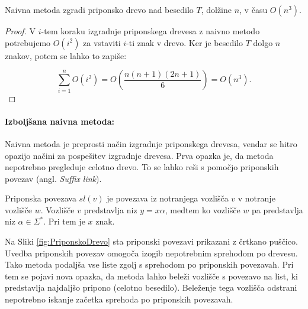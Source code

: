 \begin{izr}\label{izr:naivna}
    Naivna metoda zgradi priponsko drevo nad besedilo $T$, dolžine $n$, v času $O(n^3)$.
\end{izr}

\begin{proof}
    V $i$-tem koraku izgradnje priponskega drevesa z naivno metodo potrebujemo $O(i^2)$ za vstaviti $i$-ti znak v drevo. Ker je besedilo $T$ dolgo $n$ znakov, potem se lahko to zapiše:

    $$
        \sum_{i=1}^n O(i^2)= O\left(\dfrac{n(n+1)(2n+1)}{6}\right)=O(n^3).
    $$
\end{proof}

\paragraph{Izboljšana naivna metoda:}
Naivna metoda je preprosti način izgradnje priponskega drevesa, vendar se hitro opazijo načini za pospešitev izgradnje drevesa. Prva opazka je, da metoda nepotrebno pregleduje celotno drevo. To se lahko reši s pomočjo priponskih povezav (angl. \textit{Suffix link}).

\begin{defi}\label{def:sl}
    Priponska povezava $sl(v)$ je povezava iz notranjega vozlišča $v$ v notranje vozlišče $w$. Vozlišče $v$ predstavlja niz $y=x\alpha $, medtem ko vozlišče $w$ pa predstavlja niz $\alpha\in\Sigma^*$. Pri tem je $x$ znak.
\end{defi}

Na Sliki \ref{fig:PriponskoDrevo} sta priponski povezavi prikazani z črtkano puščico. Uvedba priponskih povezav omogoča izogib nepotrebnim sprehodom po drevesu. Tako metoda podaljša vse liste zgolj s sprehodom po priponskih povezavah. Pri tem se pojavi nova opazka, da metoda lahko beleži vozlišče s povezavo na list, ki predstavlja najdaljšo pripono (celotno besedilo). Beleženje tega vozlišča odstrani nepotrebno iskanje začetka sprehoda po priponskih povezavah.

